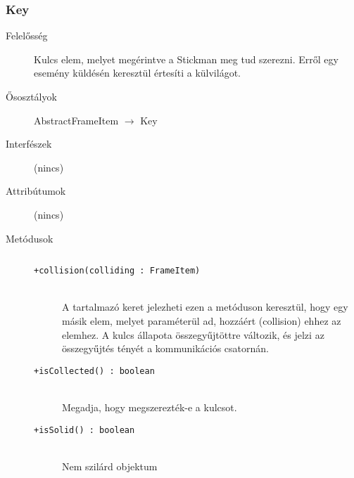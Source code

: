 		\subsubsection{Key}
			\begin{description}

				\item[Felelősség] Kulcs elem, melyet megérintve a Stickman meg tud szerezni. Erről egy esemény küldésén keresztül értesíti a külvilágot.

				\item[Ősosztályok] AbstractFrameItem $\rightarrow{}$ Key
				\item[Interfészek] (nincs)
				\item[Attribútumok] (nincs)
				\item[Metódusok]$\ $
					\begin{description}
						\item[\texttt{+collision(colliding : FrameItem)}] \hfill \\A tartalmazó keret jelezheti ezen a metóduson keresztül,  hogy egy másik elem, melyet paraméterül ad,  hozzáért (collision) ehhez az elemhez.    A kulcs állapota összegyűjtöttre változik, és jelzi az összegyűjtés  tényét a kommunikációs csatornán. 
						\item[\texttt{+isCollected() : boolean}] \hfill \\Megadja, hogy megszerezték-e a kulcsot. 
						\item[\texttt{+isSolid() : boolean}] \hfill \\Nem szilárd objektum 
					\end{description}
			\end{description}

